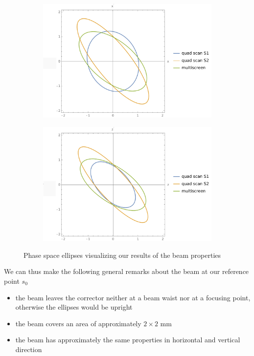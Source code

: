 \documentclass[11pt,a4paper,notitlepage]{scrartcl}
\begin{document}
\begin{figure}[H]
	\centering
	\begin{subfigure}{.49\linewidth}
		\includegraphics[width=\linewidth]{figs/horizontal_phasespace.pdf}
	\end{subfigure}
\begin{subfigure}{.49\linewidth}
	\includegraphics[width=\linewidth]{figs/vertical_phasespace.pdf}
\end{subfigure}
\caption{Phase space ellipses visualizing our results of the beam properties}
\label{fig:phasespace}
\end{figure} 
We can thus make the following general remarks about the beam at our reference point $s_0$

\begin{itemize}
	\item the beam leaves the corrector neither at a beam waist nor at a focusing point, otherwise the ellipses would be upright \cite{wille} 
	\item the beam covers an area of approximately $2\times2$ mm
	\item the beam has approximately the same properties in horizontal and vertical direction
\end{itemize}
\end{document}
